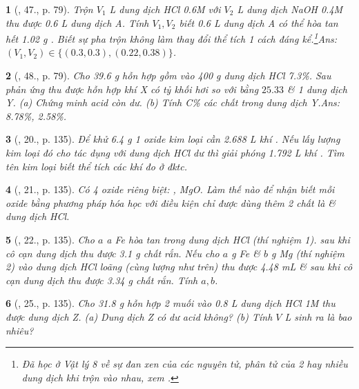 \documentclass{article}
\newtheorem{baitoan}{}
\begin{document}
\begin{baitoan}[\cite{An_Hoa_Hoc_nang_cao_8_9}, 47., p. 79]
	Trộn $V_1$ {\rm L} dung dịch {\rm HCl 0.6M} với $V_2$ {\rm L} dung dịch {\rm NaOH 0.4M} thu được {\rm0.6 L} dung dịch A. Tính $V_1,V_2$ biết {\rm0.6 L} dung dịch A có thể hòa tan hết {\rm1.02 g }. Biết sự pha trộn không làm thay đổi thể tích 1 cách đáng kể.\footnote{Đã học ở Vật lý 8 về sự đan xen của các nguyên tử, phân tử của 2 hay nhiều dung dịch khi trộn vào nhau, xem \cite[\S19, pp. 68--70]{SGK_Vat_Ly_8}.}\hfill{\sf Ans: $(V_1,V_2)\in\{(0.3,0.3),(0.22,0.38)\}$.}
\end{baitoan}

\begin{baitoan}[\cite{An_Hoa_Hoc_nang_cao_8_9}, 48., p. 79]
	Cho {\rm39.6 g} hỗn hợp gồm {\rm{}} vào {\rm400 g} dung dịch {\rm HCl 7.3\%}. Sau phản ứng thu được hỗn hợp khí X có tỷ khối hơi so với {\rm{}} bằng $25.33$ \& 1 dung dịch Y. (a) Chứng minh acid còn dư. (b) Tính C\% các chất trong dung dịch Y.\hfill{\sf Ans: 8.78\%, 2.58\%.}
\end{baitoan}

\begin{baitoan}[\cite{An_Hoa_Hoc_nang_cao_8_9}, 20., p. 135]
	Để khử {\rm6.4 g} 1 oxide kim loại cần {\rm2.688 L} khí {\rm{}}. Nếu lấy lượng kim loại đó cho tác dụng với dung dịch {\rm HCl} dư thì giải phóng {\rm1.792 L} khí {\rm{}}. Tìm tên kim loại biết thể tích các khí đo ở đktc.
\end{baitoan}

\begin{baitoan}[\cite{An_Hoa_Hoc_nang_cao_8_9}, 21., p. 135]
	Có 4 oxide riêng biệt: {\rm{}, MgO}. Làm thế nào để nhận biết mỗi oxide bằng phương pháp hóa học với điều kiện chỉ được dùng thêm 2 chất là {\rm{}} \& dung dịch {\rm HCl}.
\end{baitoan}

\begin{baitoan}[\cite{An_Hoa_Hoc_nang_cao_8_9}, 22., p. 135]
	Cho $a$ {\rm a Fe} hòa tan trong dung dịch {\rm HCl} (thí nghiệm 1). sau khi cô cạn dung dịch thu được {\rm3.1 g} chất rắn. Nếu cho $a$ {\rm g Fe} \& $b$ {\rm g Mg} (thí nghiệm 2) vào dung dịch {\rm HCl} loãng (cùng lượng như trên) thu được {\rm4.48 mL } \& sau khi cô cạn dung dịch thu được {\rm3.34 g} chất rắn. Tính $a,b$.
\end{baitoan}

\begin{baitoan}[\cite{An_Hoa_Hoc_nang_cao_8_9}, 25., p. 135]
	Cho {\rm31.8 g} hỗn hợp 2 muối {\rm{}} vào {\rm0.8 L} dung dịch {\rm HCl 1M} thu được dung dịch Z. (a) Dung dịch Z có dư acid không? (b) Tính $V$ {\rm L } sinh ra là bao nhiêu?
\end{baitoan}
\end{document}
